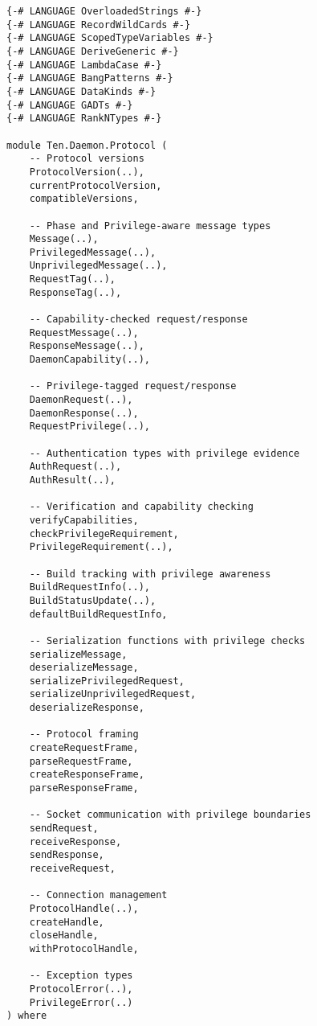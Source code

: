 \documentclass{article}
\begin{document}
\begin{tcolorbox}[title=Ten/Daemon/Protocol.hs Changes]
\begin{verbatim}
{-# LANGUAGE OverloadedStrings #-}
{-# LANGUAGE RecordWildCards #-}
{-# LANGUAGE ScopedTypeVariables #-}
{-# LANGUAGE DeriveGeneric #-}
{-# LANGUAGE LambdaCase #-}
{-# LANGUAGE BangPatterns #-}
{-# LANGUAGE DataKinds #-}
{-# LANGUAGE GADTs #-}
{-# LANGUAGE RankNTypes #-}

module Ten.Daemon.Protocol (
    -- Protocol versions
    ProtocolVersion(..),
    currentProtocolVersion,
    compatibleVersions,

    -- Phase and Privilege-aware message types
    Message(..),
    PrivilegedMessage(..),
    UnprivilegedMessage(..),
    RequestTag(..),
    ResponseTag(..),

    -- Capability-checked request/response
    RequestMessage(..),
    ResponseMessage(..),
    DaemonCapability(..),

    -- Privilege-tagged request/response
    DaemonRequest(..),
    DaemonResponse(..),
    RequestPrivilege(..),

    -- Authentication types with privilege evidence
    AuthRequest(..),
    AuthResult(..),

    -- Verification and capability checking
    verifyCapabilities,
    checkPrivilegeRequirement,
    PrivilegeRequirement(..),

    -- Build tracking with privilege awareness
    BuildRequestInfo(..),
    BuildStatusUpdate(..),
    defaultBuildRequestInfo,

    -- Serialization functions with privilege checks
    serializeMessage,
    deserializeMessage,
    serializePrivilegedRequest,
    serializeUnprivilegedRequest,
    deserializeResponse,

    -- Protocol framing
    createRequestFrame,
    parseRequestFrame,
    createResponseFrame,
    parseResponseFrame,

    -- Socket communication with privilege boundaries
    sendRequest,
    receiveResponse,
    sendResponse,
    receiveRequest,

    -- Connection management
    ProtocolHandle(..),
    createHandle,
    closeHandle,
    withProtocolHandle,

    -- Exception types
    ProtocolError(..),
    PrivilegeError(..)
) where


\end{verbatim}
\end{tcolorbox}
\end{document}
